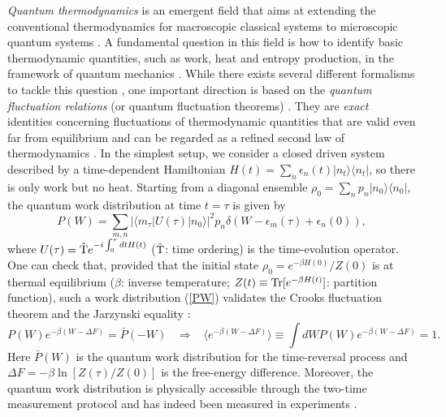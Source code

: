 \documentclass{tADP2e}
\theoremstyle{plain}
\theoremstyle{plain}
\theoremstyle{definition}
\begin{document}
\vspace{3pt}
\noindent
\emph{Quantum thermodynamics} is an emergent field that aims at extending the conventional thermodynamics for macroscopic classical systems to microscopic quantum systems \cite{JG09,SV16,JG16}. A fundamental question in this field is how to identify basic thermodynamic quantities, such as work, heat and entropy production, in the framework of quantum mechanics \cite{KR13}. While there exists several different formalisms to tackle this question \cite{BFGSL13,JO13,PS14,LM15,MPM15,RN15,LDA16}, one important direction is based on the \emph{quantum fluctuation relations} (or quantum fluctuation theorems) \cite{EM09,CM11,Funoreview}. They are \emph{exact} identities concerning fluctuations of thermodynamic quantities that are valid even far from equilibrium and can be regarded as a refined second law of thermodynamics \cite{JC11,US12b}. In the simplest setup, we consider a closed driven system described by a time-dependent Hamiltonian $H(t)=\sum_n \epsilon_n(t)|n_t\rangle\langle n_t|$, so there is only work but no heat. Starting from a diagonal ensemble $\rho_0=\sum_n p_n|n_0\rangle\langle n_0|$, the quantum work distribution at time $t=\tau$ is given by \cite{HT00,JK00}
\begin{equation}
P(W)=\sum_{m,n}|\langle m_\tau |U(\tau)|n_0\rangle|^2p_n\delta(W-\epsilon_m(\tau)+\epsilon_n(0)),
\label{PW} 
\end{equation}
where $U(\tau)=\hat{{\rm T}}e^{-i\int^\tau_0 dtH(t)}$ ($\hat{{\rm T}}$: time ordering) is the time-evolution operator. One can check that, provided that the initial state $\rho_0=e^{-\beta H(0)}/Z(0)$ is at thermal equilibrium ($\beta$: inverse temperature; $Z(t)\equiv {\rm Tr}[e^{-\beta H(t)}]$: partition function), such a work distribution (\ref{PW}) validates the Crooks fluctuation theorem \cite{CGE99} and the Jarzynski equality \cite{JC97}: 
\begin{equation}
P(W)e^{-\beta (W-\Delta F)}=\bar P(-W)\;\;\;\Rightarrow\;\;\;
\langle e^{-\beta(W-\Delta F)}\rangle \equiv\int dW P(W)e^{-\beta (W-\Delta F)}=1.
\label{JECFT}
\end{equation}
Here $\bar P(W)$ is the quantum work distribution for the time-reversal process and $\Delta F=-\beta \ln [Z(\tau)/Z(0)]$ is the free-energy difference. Moreover, the quantum work distribution is physically accessible through the two-time measurement protocol \cite{TP07} and has indeed been measured in experiments \cite{SA15}. 
\end{document}
